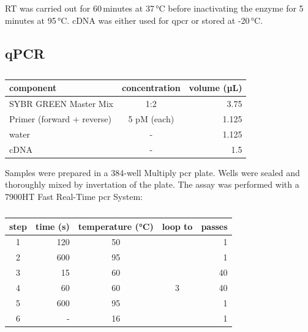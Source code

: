     \ac{RT} was carried out for 60\,minutes at 37\,°C before inactivating the enzyme for 5\,minutes at 95\,°C. \Ac{cDNA} was either used for \ac{qpcr} or stored at -20\,°C.

    \subsection{qPCR}
    \begin{table}[h]
    \capstart
	\centering
	\begin{minipage}{\captionwidth}
	   	\caption[qPCR samples]{}
	   	\label{tab:qPCR_MM}
	\end{minipage}
    \begin{tabular}{|l|c|r|}
        \hline
        component                  & concentration & volume (µL) \\ \hline
        SYBR GREEN Master Mix      & 1:2          & 3.75        \\
        Primer (forward + reverse) & 5 pM (each)  & 1.125       \\
        \ac{water}                        & -            & 1.125       \\
        \ac{cDNA}                       & -            & 1.5           \\ \hline
    \end{tabular}
    \end{table}
    Samples were prepared in a 384-well Multiply \ac{pcr} plate. Wells were sealed and thoroughly mixed by invertation of the plate. The assay was performed with a 7900HT Fast Real-Time \ac{pcr} System:

    \begin{table}[h]
    \capstart
    \centering
    \begin{minipage}{\captionwidth}
        \caption[qPCR programme]{}
        \label{tab:qPCR_programme}
    \end{minipage}
    \begin{tabular}{|c|r|c|c|r|}
    \hline
        step & time (s) & temperature (°C) & loop to & passes \\ \hline
        1    & 120      & 50               &         & 1      \\
        2    & 600      & 95               &         & 1      \\
        3    & 15       & 60               &         & 40     \\
        4    & 60       & 60               & 3       & 40     \\
        5    & 600      & 95               &         & 1      \\
        6    & -        & 16               &         & 1      \\ \hline
    \end{tabular}
    \end{table}

